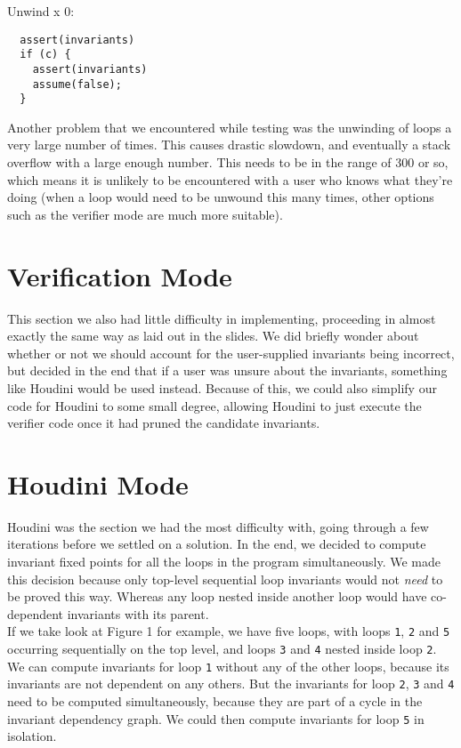\documentclass[11pt]{article}
\begin{document}
\vspace{\baselineskip}

Unwind x 0:
\begin{verbatim}
  assert(invariants)
  if (c) {
    assert(invariants)
    assume(false);
  }
\end{verbatim}

Another problem that we encountered while testing was the unwinding of loops a very large number of times. This causes drastic slowdown, and eventually a stack overflow with a large enough number. This needs to be in the range of 300 or so, which means it is unlikely to be encountered with a user who knows what they're doing (when a loop would need to be unwound this many times, other options such as the verifier mode are much more suitable). \\

\section{Verification Mode}

This section we also had little difficulty in implementing, proceeding in almost exactly the same way as laid out in the slides. We did briefly wonder about whether or not we should account for the user-supplied invariants being incorrect, but decided in the end that if a user was unsure about the invariants, something like Houdini would be used instead. Because of this, we could also simplify our code for Houdini to some small degree, allowing Houdini to just execute the verifier code once it had pruned the candidate invariants. \\

\section{Houdini Mode}

Houdini was the section we had the most difficulty with, going through a few iterations before we settled on a solution. In the end, we decided to compute invariant fixed points for all the loops in the program simultaneously. We made this decision because only top-level sequential loop invariants would not \emph{need} to be proved this way. Whereas any loop nested inside another loop would have co-dependent invariants with its parent. \\

If we take look at Figure 1 for example, we have five loops, with loops \verb|1|, \verb|2| and \verb|5| occurring sequentially on the top level, and loops \verb|3| and \verb|4| nested inside loop \verb|2|. We can compute invariants for loop \verb|1| without any of the other loops, because its invariants are not dependent on any others. But the invariants for loop \verb|2|, \verb|3| and \verb|4| need to be computed simultaneously, because they are part of a cycle in the invariant dependency graph. We could then compute invariants for loop \verb|5| in isolation. \\
\end{document}
